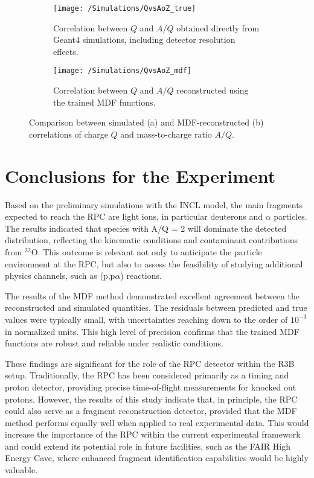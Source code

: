 \begin{figure}[ht]
	\centering
	
	\begin{subfigure}[b]{0.75\textwidth}
		\texttt{[image: /Simulations/QvsAoZ\_true]}
		\caption{Correlation between $Q$ and $A/Q$ obtained directly from Geant4 simulations, including detector resolution effects.}
		\label{fig:QvsAoZ_true} 
	\end{subfigure}
	
	\medskip %
	\begin{subfigure}[b]{0.75\textwidth}
		\texttt{[image: /Simulations/QvsAoZ\_mdf]}
		\caption{Correlation between $Q$ and $A/Q$ reconstructed using the trained \gls{MDF} functions.}
		\label{fig:QvsAoZ_mdf}
	\end{subfigure}
	
	\caption[Comparison of simulated and reconstructed charge–mass correlations]{Comparison between simulated (a) and MDF-reconstructed (b) correlations of charge $Q$ and mass-to-charge ratio $A/Q$.}
	
\end{figure}

\section{Conclusions for the Experiment}

Based on the preliminary simulations with the INCL model, the main fragments expected to reach the \gls{RPC} are light ions, in particular deuterons and $\alpha$ particles. The results indicated that species with A/Q = 2 will dominate the detected distribution, reflecting the kinematic conditions and contaminant contributions from $^{22}$O. This outcome is relevant not only to anticipate the particle environment at the \gls{RPC}, but also to assess the feasibility of studying additional physics channels, such as (p,p$\alpha$) reactions.

The results of the \gls{MDF} method demonstrated excellent agreement between the reconstructed and simulated quantities. The residuals between predicted and true values were typically small, with uncertainties reaching down to the order of $10^{-3}$ in normalized units. This high level of precision confirms that the trained \gls{MDF} functions are robust and reliable under realistic conditions.

These findings are significant for the role of the \gls{RPC} detector within the \gls{R3B} setup. Traditionally, the \gls{RPC} has been considered primarily as a timing and proton detector, providing precise time-of-flight measurements for knocked out protons. However, the results of this study indicate that, in principle, the \gls{RPC} could also serve as a fragment reconstruction detector, provided that the \gls{MDF} method performs equally well when applied to real experimental data. This would increase the importance of the \gls{RPC} within the current experimental framework and could extend its potential role in future facilities, such as the \gls{FAIR} High Energy Cave, where enhanced fragment identification capabilities would be highly valuable.